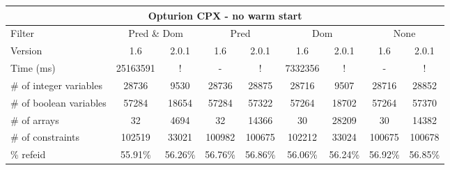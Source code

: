\documentclass{standalone}
\begin{document}
\begin{table}[H]
\footnotesize
\begin{tabular}{lc|c|c|c|c|c|c|c}
\multicolumn{9}{c}{Opturion CPX - no warm start} \\ 
\hline\hline Filter & \multicolumn{2}{c|}{Pred \& Dom} &\multicolumn{2}{c|}{Pred}  & \multicolumn{2}{c|}{Dom} & \multicolumn{2}{c}{None} \\ 
\hline Version & 1.6 & 2.0.1 & 1.6 & 2.0.1 & 1.6 & 2.0.1 & 1.6 & 2.0.1 \\ 
Time (ms)               & 25163591 & !       & -       & !       & 7332356 & !       & -       & !       \\ 
\# of integer variables & 28736    & 9530    & 28736   & 28875   & 28716   & 9507    & 28716   & 28852	  \\ 
\# of boolean variables & 57284    & 18654   & 57284   & 57322   & 57264   & 18702   & 57264   & 57370	  \\ 
\# of arrays            & 32       & 4694    & 32      & 14366   & 30      & 28209   & 30      & 14382	  \\ 
\# of constraints       & 102519   & 33021   & 100982  & 100675  & 102212  & 33024   & 100675  & 100678  \\ 
\% refeid               & 55.91\%  & 56.26\% & 56.76\% & 56.86\% & 56.06\% & 56.24\% & 56.92\% & 56.85\% \\ 
\end{tabular} 
\end{table}
\end{document}
